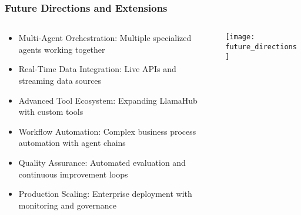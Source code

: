 \begin{frame}[fragile]\frametitle{Future Directions and Extensions}
\begin{columns}
    \begin{column}[T]{0.6\linewidth}
      \begin{itemize}
		\item Multi-Agent Orchestration: Multiple specialized agents working together
		\item Real-Time Data Integration: Live APIs and streaming data sources
		\item Advanced Tool Ecosystem: Expanding LlamaHub with custom tools
		\item Workflow Automation: Complex business process automation with agent chains
		\item Quality Assurance: Automated evaluation and continuous improvement loops
		\item Production Scaling: Enterprise deployment with monitoring and governance
	  \end{itemize}
    \end{column}
    \begin{column}[T]{0.4\linewidth}
		\begin{center}
		\texttt{[image: future\_directions]}
		\end{center}	
    \end{column}
  \end{columns}
\end{frame}

